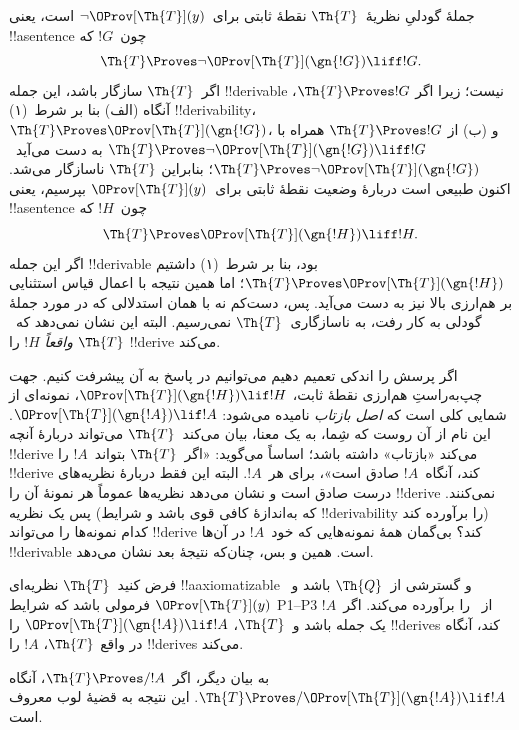 \documentclass[../../../include/open-logic-section]{subfiles}
\begin{document}


جملهٔ گودلیِ نظریهٔ~$\Th{T}$ نقطهٔ ثابتی برای~$\lnot
\OProv[\Th{T}](y)$ است، یعنی !!a{sentence} چون~$!G$ که
\[
\Th{T} \Proves \lnot \OProv[\Th{T}](\gn{!G}) \liff !G.
\]
اگر~$\Th{T}$ سازگار باشد، این جمله !!{derivable} نیست؛ زیرا اگر
$\Th{T} \Proves !G$، آنگاه (الف) بنا بر شرط~(۱) !!{derivability}،
$\Th{T} \Proves \OProv[\Th{T}](\gn{!G})$، و (ب) از
$\Th{T} \Proves !G$ همراه با
$\Th{T} \Proves \lnot \OProv[\Th{T}](\gn{!G}) \liff !G$ به دست
می‌آید~$\Th{T} \Proves \lnot \OProv[\Th{T}](\gn{!G})$؛ بنابراین
$\Th{T}$ ناسازگار می‌شد. اکنون طبیعی است دربارهٔ وضعیت نقطهٔ ثابتی
برای~$\OProv[\Th{T}](y)$ بپرسیم، یعنی !!a{sentence} چون~$!H$ که
\[
\Th{T} \Proves \OProv[\Th{T}](\gn{!H}) \liff !H.
\]
اگر این جمله !!{derivable} بود، بنا بر شرط~(۱) داشتیم
$\Th{T} \Proves \OProv[\Th{T}](\gn{!H})$؛ اما همین نتیجه با اعمال
قیاس استثنایی بر هم‌ارزی بالا نیز به دست می‌آید. پس، دست‌کم نه با همان
استدلالی که در مورد جملهٔ گودلی به کار رفت، به ناسازگاری~$\Th{T}$
نمی‌رسیم. البته این نشان نمی‌دهد که~$\Th{T}$ \emph{واقعاً} $!H$ را
!!{derive} می‌کند.

اگر پرسش را اندکی تعمیم دهیم می‌توانیم در پاسخ به آن پیشرفت کنیم. جهت
چپ‌به‌راستِ هم‌ارزی نقطهٔ ثابت،
$\OProv[\Th{T}](\gn{!H}) \lif !H$، نمونه‌ای از شمایی کلی است که
\emph{اصل بازتاب} نامیده می‌شود:
$\OProv[\Th{T}](\gn{!A}) \lif !A$. این نام از آن روست که شِما، به یک
معنا، بیان می‌کند~$\Th{T}$ می‌تواند دربارهٔ آنچه !!{derive} می‌کند
«بازتاب» داشته باشد؛ اساساً می‌گوید: «اگر~$\Th{T}$ بتواند~$!A$ را
!!{derive} کند، آنگاه~$!A$ صادق است»، برای هر~$!A$. البته این فقط
دربارهٔ نظریه‌های درست صادق است و نشان می‌دهد نظریه‌ها عموماً هر نمونهٔ
آن را !!{derive} نمی‌کنند. پس یک نظریه (که به‌اندازهٔ کافی قوی باشد و
شرایط !!{derivability} را برآورده کند) کدام نمونه‌ها را می‌تواند
!!{derive} کند؟ بی‌گمان همهٔ نمونه‌هایی که خود~$!A$ در آن‌ها
!!{derivable} است. همین و بس، چنان‌که نتیجهٔ بعد نشان می‌دهد.

\begin{thm}
فرض کنید~$\Th{T}$ نظریه‌ای !!a{axiomatizable} و گسترشی از~$\Th{Q}$ باشد
و~$\OProv[\Th{T}](y)$ فرمولی باشد که شرایط P1--P3 از~
را برآورده می‌کند. اگر~$!A$ یک جمله باشد و~$\Th{T}$،
$\OProv[\Th{T}](\gn{!A}) \lif !A$ را !!{derive}s کند، آنگاه در واقع
$\Th{T}$، $!A$ را !!{derive}s می‌کند.
\end{thm}

به بیان دیگر، اگر~$\Th{T} \Proves/ !A$، آنگاه
$\Th{T} \Proves/ \OProv[\Th{T}](\gn{!A}) \lif !A$. این نتیجه به
قضیهٔ لوب معروف است.
\end{document}
